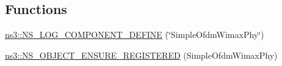 \subsection*{Functions}
\begin{DoxyCompactItemize}
\item 
\hyperlink{namespacens3_a93b23558e7a45418d8e057d72e8fa319}{ns3\+::\+N\+S\+\_\+\+L\+O\+G\+\_\+\+C\+O\+M\+P\+O\+N\+E\+N\+T\+\_\+\+D\+E\+F\+I\+NE} (\char`\"{}Simple\+Ofdm\+Wimax\+Phy\char`\"{})
\item 
\hyperlink{namespacens3_adf496245caf153dffbcb1d065ea360c4}{ns3\+::\+N\+S\+\_\+\+O\+B\+J\+E\+C\+T\+\_\+\+E\+N\+S\+U\+R\+E\+\_\+\+R\+E\+G\+I\+S\+T\+E\+R\+ED} (Simple\+Ofdm\+Wimax\+Phy)
\end{DoxyCompactItemize}
